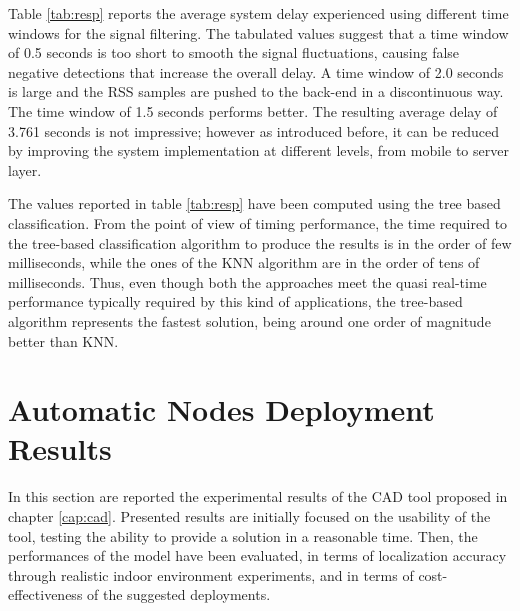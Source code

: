 Table \ref{tab:resp} reports the average system delay experienced using different time windows for the signal filtering. The tabulated values suggest that a time window of 0.5 seconds is too short to smooth the signal fluctuations, causing false negative detections that increase the overall delay. A time window of 2.0 seconds is large and the RSS samples are pushed to the back-end in a discontinuous way. The time window of 1.5 seconds performs better. The resulting average delay of 3.761 seconds is not impressive; however as introduced before, it can be reduced by improving the system implementation at different levels, from mobile to server layer.

The values reported in table \ref{tab:resp} have been computed using the tree based classification.
From the point of view of timing performance, the time required to the tree-based classification algorithm to produce the results is in the order of few milliseconds, while the ones of the KNN algorithm are in the order of tens of milliseconds. Thus, even though both the approaches meet the quasi real-time performance typically required by this kind of applications, the tree-based algorithm represents the fastest solution, being around one order of magnitude better than KNN.


\section{Automatic Nodes Deployment Results}
\label{sec:CAD-test}

In this section are reported the experimental results of the CAD tool proposed in chapter \ref{cap:cad}.
Presented results are initially focused on the usability of the tool, testing the ability to provide a solution in a reasonable time. Then, the performances of the model have been evaluated, in terms of localization accuracy through realistic indoor environment experiments, and in terms of cost-effectiveness of the suggested deployments.

